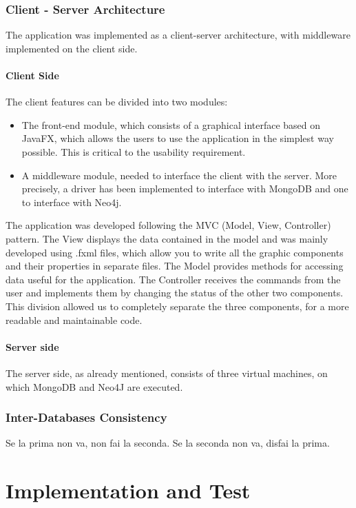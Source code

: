 \documentclass[a4paper]{report}
\begin{document}
\subsection{Client - Server Architecture}
The application was implemented as a client-server architecture, with middleware implemented on the client side.
\subsubsection{Client Side}
The client features can be divided into two modules:
\begin{itemize}
\item The front-end module, which consists of a graphical interface based on JavaFX, which allows the users to use the application in the simplest way possible. This is critical to the usability requirement.
\item A middleware module, needed to interface the client with the server. More precisely, a driver has been implemented to interface with MongoDB and one to interface with Neo4j.
\end{itemize}
\noindent The application was developed following the MVC (Model, View, Controller) pattern. The View displays the data contained in the model and was mainly developed using .fxml files, which allow you to write all the graphic components and their properties in separate files. The Model provides methods for accessing data useful for the application. The Controller receives the commands from the user and implements them by changing the status of the other two components. This division allowed us to completely separate the three components, for a more readable and maintainable code.

\subsubsection{Server side}
The server side, as already mentioned, consists of three virtual machines, on which MongoDB and Neo4J are executed.


\subsection{Inter-Databases Consistency}
Se la prima non va, non fai la seconda.
Se la seconda non va, disfai la prima.



\chapter{Implementation and Test}
\end{document}
